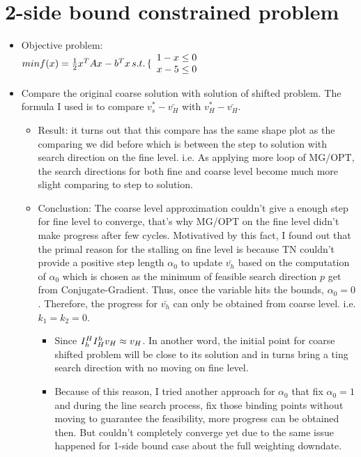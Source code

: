 \documentclass[10pt]{article}
\begin{document}
\section{2-side bound constrained problem} 
\begin{itemize}
\item Objective problem:  \\

$min f(x)=\frac{1}{2}  x^T Ax-b^T x\, s.t.\, \{
\begin{array}  {rcr}
 1-x \leq 0\\
 x-5\leq 0\\
\end{array}$\\

\item Compare the original coarse solution with solution of shifted problem. The formula I used is to compare $v_{s}^{*}-\bar{v_{H}}$ with $v_{H}^{*}-\bar{v_{H}}$.
\begin{itemize}
\item Result: it turns out that this compare has the same shape plot as the comparing we did before which is  between the step to solution with search direction on the fine level. i.e. As applying more loop of MG/OPT, the search directions for both fine and coarse level become much more slight comparing to step to solution.
\item Conclustion: The coarse level approximation couldn't  give a enough step for fine level to converge, that's why MG/OPT on the fine level didn't make progress after few cycles. Motivatived by this fact, I found out that the primal reason for the stalling on fine level is because TN couldn't provide a positive step length $\alpha_{0}$ to update $\bar{v_{h}}$ based on the computation of $\alpha_{0}$ which is chosen as the minimum of feasible search direction $p$ get from Conjugate-Gradient. Thus, once the variable hits the bounds, $\alpha_{0}=0$ . Therefore, the progress for $\bar{v_{h}}$ can only be obtained from coarse level. i.e. $k_{1}=k_{2}=0$.
\begin{itemize}
\item Since $I_h^H I_H^h v_{H}\approx v_{H}$. In another word, the initial point for coarse shifted problem will be close to its solution and in turns bring a ting search direction with no moving on fine level.
\item Because of this reason,  I tried another approach for $\alpha_{0}$ that fix $\alpha_{0}=1$ and during the line search process, fix those binding points without moving to guarantee the feasibility, more progress can be obtained then. But couldn't completely converge yet due to the same issue happened for 1-side bound case about the full weighting downdate.

\end{itemize}
\end{itemize}
\end{itemize}
\end{document}
